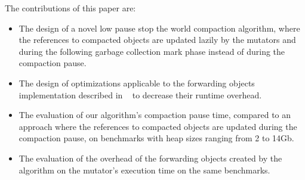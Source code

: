 \documentclass[sigplan,10pt,review,anonymous]{acmart}\settopmatter{printfolios=true,printccs=false,printacmref=false}
\newcommand{\egb}[1]{\color{blue}\fbox{\bfseries\sffamily\scriptsize Elisa:}{\sf\small$\blacktriangleright$\textit{#1}$\blacktriangleleft$}\color{black}}
\begin{document}
The contributions of this paper are:
\begin{itemize}
\item The design of a novel low pause stop the world compaction algorithm, where the references to compacted objects are updated lazily by the mutators and during the following garbage collection mark phase instead of during the compaction pause. 
\item The design of optimizations applicable to the forwarding objects implementation described in ~\cite{Forwarders} to decrease their runtime overhead.
\item 
The evaluation of our algorithm's compaction pause time, compared to an approach where the references to compacted objects are updated during the compaction pause, on benchmarks with heap sizes ranging from 2 to 14Gb.
\item The evaluation of the overhead of the forwarding objects created by the algorithm on the mutator's execution time on the same benchmarks.
\end{itemize}
\vspace{-0.2cm} %


\end{document}
